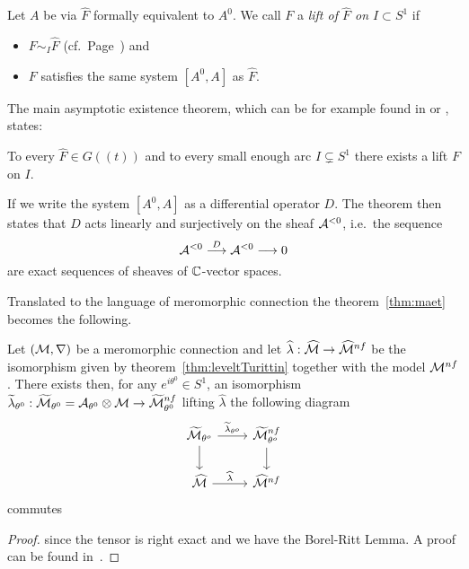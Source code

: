 \begin{defn}\label{defn:lift}
  Let $A$ be via $\hat F$ formally equivalent to $A^0$.
  We call $F$ a \emph{lift of $\hat F$ on $I\subset S^1$} if
  \begin{itemize}
    \item $F\sim_I\hat F$
      (cf.\ Page~\pageref{page:notationForAsymptoticExpansion}) and
    \item $F$ satisfies the same system $[A^0,A]$ as $\hat F$.
  \end{itemize}
\end{defn}
The main asymptotic existence theorem, which can be for example found in
\cite[Thm.3.1]{boalch} or \cite[Sec.4.4]{Loday2014}, states:
\begin{thm}[M.A.E.T]\label{thm:maet}
  To every $\hat F\in G(\!(t)\!)$ and to every small enough arc
  $I\subsetneq S^1$ there exists a lift $F$ on $I$.
  \begin{s-rem}
    If we write the system $[A^0,A]$ as a differential operator $D$.
    The theorem then states that $D$ acts linearly and surjectively on the
    sheaf $\mathcal{A}^{<0}$, i.e.\ the sequence
    \[
      \mathcal{A}^{<0}\overset{D}\longrightarrow\mathcal{A}^{<0} \longrightarrow 0
    \]
    are exact sequences of sheaves of $\mathbb{C}$-vector spaces.
    \begin{comment}
      Proof in \textbf{[Mal91a, App 1; Thm 1]}
    \end{comment}
  \end{s-rem}
\end{thm}
\begin{comment}
  \begin{proof}
    \TODO{}
  \end{proof}
\end{comment}

\TODO{}

Translated to the language of meromorphic connection the theorem~\ref{thm:maet}
becomes the following.
\begin{thm}
  Let $(\mathcal{M},\nabla)$ be a meromorphic connection and let
  $\widehat\lambda:\widehat{\mathcal{M}}\to\widehat{\mathcal{M}}^{nf}$ be the isomorphism given by
  theorem~\ref{thm:leveltTurittin} together with the model $\mathcal{M}^{nf}$.
  There exists then, for any $e^{i\theta^0}\in S^1$, an isomorphism
  $\widetilde\lambda_{\theta^0}:
  \widetilde{\mathcal{M}}_{\theta^0}=\mathcal{A}_{\theta^0}\otimes\mathcal{M}\to\widetilde{\mathcal{M}}_{\theta^0}^{nf}$
  lifting $\hat\lambda$  the following diagram
  \[ \begin{tikzcd}
      \tilde\cM_{\theta^o} \dar \rar{\tilde\lambda_{\theta^o}} &
      \tilde\cM^{nf}_{\theta^o} \dar
      \\\hat\cM \rar{\hat\lambda} &
      \hat\cM^{nf}
  \end{tikzcd} \]
  commutes
\end{thm}
\begin{proof}
   since the tensor is right exact and we have the
  Borel-Ritt Lemma.
  A proof can be found in~\cite[Sec.II.2.4]{sabbah_cimpa90}.
\end{proof}

